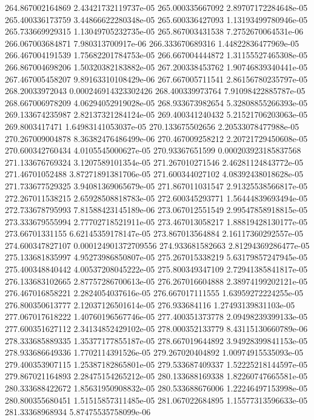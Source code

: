 {264.867002164869 2.43421732119737e-05
265.000335667092 2.89707172284648e-05
265.400336173759 3.44866622280348e-05
265.600336427093 1.13193499780946e-05
265.733669929315 1.13049705232735e-05
265.867003431538 7.2752670064531e-06
266.067003684871 7.980313700917e-06
266.333670689316 1.44822836477969e-05
266.467004191539 1.75682201784753e-05
266.667004444872 1.31155527465308e-05
266.867004698206 1.50320382183882e-05
267.200338453762 1.90746839340441e-05
267.467005458207 9.89163310108429e-06
267.667005711541 2.86156780235797e-05
268.20033972043 0.000246914323302426
268.400339973764 7.91098422885787e-05
268.667006978209 4.06294052919028e-05
268.933673982654 5.32808855266393e-05
269.133674235987 2.82137321284124e-05
269.400341240432 5.21521706203063e-05
269.8003417471 1.64983141053037e-05
270.133675502656 2.20533078477988e-05
270.267009004878 8.36382476486499e-06
270.467009258212 2.20721729450608e-05
270.600342760434 4.0105545000627e-05
270.93367651599 0.000203923185837568
271.133676769324 3.1207589101354e-05
271.267010271546 2.46281124843772e-05
271.46701052488 3.87271891381706e-05
271.600344027102 4.08392438018628e-05
271.733677529325 3.94081369065679e-05
271.867011031547 2.91325538566817e-05
272.267011538215 2.65928508818783e-05
272.600345293771 1.56444839693494e-05
272.733678795993 7.81588423145189e-06
273.067012551549 2.99547858918815e-05
273.333679555994 2.77702718521911e-05
273.467013058217 1.88819428130177e-05
273.66701331155 6.62145359178147e-05
273.867013564884 2.16117360292557e-05
274.600347827107 0.000124901372709556
274.933681582663 2.81294369286477e-05
275.133681835997 4.95273986850807e-05
275.267015338219 5.63179857247945e-05
275.400348840442 4.00537208045222e-05
275.800349347109 2.72941385841817e-05
276.133683102665 2.87757286700613e-05
276.267016604888 2.38974199202121e-05
276.467016858221 2.2824054037616e-05
276.667017111555 1.63959272224255e-05
276.800350613777 2.12037126501614e-05
276.933684116 1.27493139831103e-05
277.067017618222 1.40760196567746e-05
277.400351373778 2.09498239399133e-05
277.600351627112 2.34134852429102e-05
278.000352133779 8.43115130660789e-06
278.333685889335 1.35377177855187e-05
278.667019644892 3.94928399841153e-05
278.933686649336 1.7702114391526e-05
279.267020404892 1.00974915535093e-05
279.400353907115 1.25387182865801e-05
279.533687409337 1.52225218144597e-05
279.867021164893 2.28475154265212e-05
280.133688169338 1.82260747665581e-05
280.333688422672 1.85631950908832e-05
280.533688676006 1.22246497153998e-05
280.800355680451 1.51515857311485e-05
281.067022684895 1.15577313596633e-05
281.33368968934 5.87475535758099e-06
}
